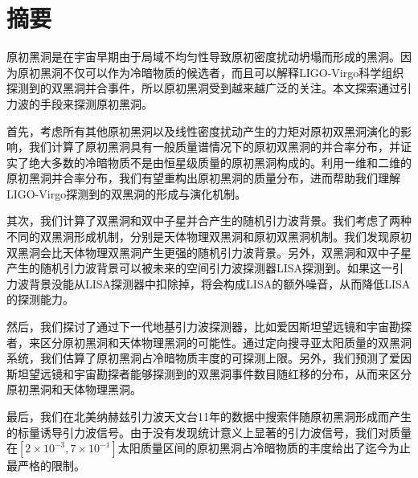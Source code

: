 \maketitle%
\MAKETITLE%
\makedeclaration%
\intobmk\chapter*{摘\quad 要}%
\setcounter{page}{1}%

原初黑洞是在宇宙早期由于局域不均匀性导致原初密度扰动坍塌而形成的黑洞。因为原初黑洞不仅可以作为冷暗物质的候选者，而且可以解释LIGO-Virgo科学组织探测到的双黑洞并合事件，所以原初黑洞受到越来越广泛的关注。本文探索通过引力波的手段来探测原初黑洞。

首先，考虑所有其他原初黑洞以及线性密度扰动产生的力矩对原初双黑洞演化的影响，我们计算了原初黑洞具有一般质量谱情况下的原初双黑洞的并合率分布，并证实了绝大多数的冷暗物质不是由恒星级质量的原初黑洞构成的。利用一维和二维的原初黑洞并合率分布，我们有望重构出原初黑洞的质量分布，进而帮助我们理解LIGO-Virgo探测到的双黑洞的形成与演化机制。

其次，我们计算了双黑洞和双中子星并合产生的随机引力波背景。我们考虑了两种不同的双黑洞形成机制，分别是天体物理双黑洞和原初双黑洞机制。我们发现原初双黑洞会比天体物理双黑洞产生更强的随机引力波背景。另外，双黑洞和双中子星产生的随机引力波背景可以被未来的空间引力波探测器LISA探测到。如果这一引力波背景没能从LISA探测器中扣除掉，将会构成LISA的额外噪音，从而降低LISA的探测能力。

然后，我们探讨了通过下一代地基引力波探测器，比如爱因斯坦望远镜和宇宙勘探者，来区分原初黑洞和天体物理黑洞的可能性。通过定向搜寻亚太阳质量的双黑洞系统，我们估算了原初黑洞占冷暗物质丰度的可探测上限。另外，我们预测了爱因斯坦望远镜和宇宙勘探者能够探测到的双黑洞事件数目随红移的分布，从而来区分原初黑洞和天体物理黑洞。

最后，我们在北美纳赫兹引力波天文台11年的数据中搜索伴随原初黑洞形成而产生的标量诱导引力波信号。由于没有发现统计意义上显著的引力波信号，我们对质量在$[2 \times 10^{-3}, 7\times 10^{-1}]$太阳质量区间的原初黑洞占冷暗物质的丰度给出了迄今为止最严格的限制。



